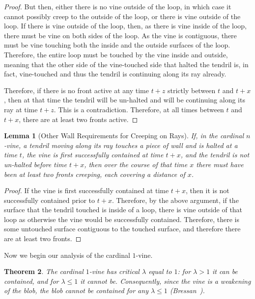 \documentclass[12pt]{article}
\theoremstyle{plain}
\newtheorem{theorem}{Theorem}
\newtheorem{lemma}[theorem]{Lemma}
\theoremstyle{definition}
\begin{document}
\begin{proof}[Proof]
But then, either there is no vine outside of the loop, in which case it cannot possibly creep to the outside of the loop, or there is vine outside of the loop. If there is vine outside of the loop, then, as there is vine inside of the loop, there must be vine on both sides of the loop. As the vine is contiguous, there must be vine touching both the inside and the outside surfaces of the loop. Therefore, the entire loop must be touched by the vine inside and outside, meaning that the other side of the vine-touched side that halted the tendril is, in fact, vine-touched and thus the tendril is continuing along its ray already. 

Therefore, if there is no front active at any time \(t+z\) strictly between \(t\) and \(t+x\), then at that time the tendril will be un-halted and will be continuing along its ray at time \(t+z\). This is a contradiction. Therefore, at all times between \(t\) and \(t+x\), there are at least two fronts active. 
\end{proof}

\begin{lemma}[Other Wall Requirements for Creeping on Rays]
\label{lma:other-wall-reqs-rays}
If, in the cardinal \(n\)-vine, a tendril moving along its ray touches a piece of wall and is halted at a time \(t\), the vine is first successfully contained at time \(t+x\), and the tendril is not un-halted before time \(t+x\), then over the course of that time \(x\) there must have been at least two fronts creeping, each covering a distance of \(x\). 
\end{lemma}
\begin{proof}[Proof]
If the vine is first successfully contained at time \(t+x\), then it is not successfully contained prior to \(t+x\). Therefore, by the above argument, if the surface that the tendril touched is inside of a loop, there is vine outside of that loop as otherwise the vine would be successfully contained. Therefore, there is some untouched surface contiguous to the touched surface, and therefore there are at least two fronts.

\end{proof}

Now we begin our analysis of the cardinal \(1\)-vine. 

\begin{theorem}
\label{thm:cardinal-1-vine}
The cardinal \(1\)-vine has critical \(\lambda\) equal to \(1\): for \(\lambda>1\) it can be contained, and for \(\lambda\leq 1\) it cannot be. Consequently, since the vine is a weakening of the blob, the blob cannot be contained for any \(\lambda\leq1\) (Bressan~\cite{bressan2007}).
\end{theorem}
\end{document}
